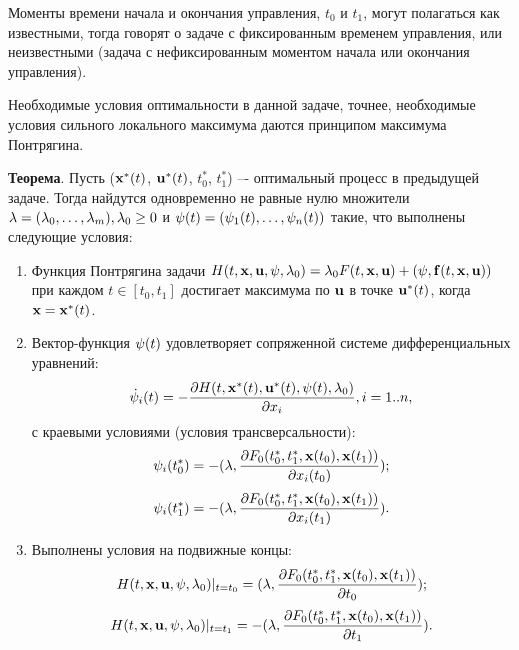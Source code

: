 \documentclass[a4paper, 12pt]{article}
\begin{document}
Моменты времени начала и окончания управления, $t_0$ и $t_1$, могут
полагаться как известными, тогда говорят о задаче с фиксированным
временем управления, или неизвестными (задача с нефиксированным
моментом начала или окончания управления).

Необходимые условия оптимальности в данной задаче, точнее,
необходимые условия сильного локального максимума даются принципом
максимума Понтрягина.

{\bf Теорема}. Пусть (${\bf x}^*(t)$, ${\bf u}^*(t)$, $t_0^*$, $t_1^*$) –- оптимальный процесс в предыдущей задаче. Тогда найдутся одновременно не равные нулю множители ${\bf \lambda}=(\lambda_0,\dots,\lambda_m),\lambda_0 \ge 0$ и  
${\bf \psi} (t)=(\psi_1(t),\dots,\psi_n(t))$ такие, что
выполнены следующие условия:
\begin{enumerate}
    \item Функция Понтрягина задачи $H(t,{\bf x}, {\bf u}, {\bf \psi},\lambda_0)=\lambda_0 F(t,{\bf x}, {\bf u}) + ({\bf \psi},{\bf f}(t,{\bf x}, {\bf u}))$ при каждом $t \in [t_0,t_1]$ достигает максимума по ${\bf u}$ в точке ${\bf u}^*(t)$, когда ${\bf x}={\bf x}^*(t)$.
    \item Вектор-функция ${\bf \psi}(t)$ удовлетворяет сопряженной системе дифференциальных уравнений: $${\dot {\bf \psi}}_i (t)=- \dfrac{\partial H(t,{\bf x}^*(t),{\bf u}^*(t),{\bf \psi}(t),\lambda_0)}{\partial x_i}, i=1..n,$$ с краевыми условиями (условия трансверсальности):
    $$\psi_i (t_0^*)=-(\lambda,\dfrac{\partial F_0 (t_0^*,t_1^*,{\bf x}(t_0),{\bf x}(t_1))}{\partial x_i(t_0)} );$$
    $$\psi_i (t_1^*)=-(\lambda,\dfrac{\partial F_0 (t_0^*,t_1^*,{\bf x}(t_0),{\bf x}(t_1))}{\partial x_i(t_1)} ).$$
    \item Выполнены условия на подвижные концы:
    $$H(t,{\bf x}, {\bf u}, {\bf \psi},\lambda_0)|_{t=t_0}=(\lambda,\dfrac{\partial F_0 (t_0^*,t_1^*,{\bf x}(t_0),{\bf x}(t_1))}{\partial t_0} );$$
    $$H(t,{\bf x}, {\bf u}, {\bf \psi},\lambda_0)|_{t=t_1}=-(\lambda,\dfrac{\partial F_0 (t_0^*,t_1^*,{\bf x}(t_0),{\bf x}(t_1))}{\partial t_1} ).$$
\end{enumerate}
\end{document}
